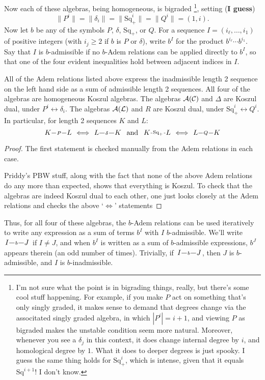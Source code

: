 \documentclass[11pt]{article}
\makeatletter
\newcommand{\produces}[3]{{#1}{#3}{#2}}
\renewcommand{\Q}{Q}
\newcommand{\SqShift}{\Sq_{+}}
\newcommand{\Sq}{\mathrm{Sq}}
\newcommand{\LieSteen}{\calA(\calL)}
\newcommand{\CommSteen}{\calA(\calC)}
\renewcommand{\produces}[3]{
{
\def\labelstyle{\scriptstyle}
\xymatrix@C=2em@1{
{#1}
\ar@{-}[r]|-{{\,#3\,}}
&%
{#2}%
}}}
\makeatother
\begin{document}
\begin{SteenrodAlgebrasAndTheirKoszulDuals}
Now each of these algebras, being homogeneous, is bigraded%
\footnote{I'm not sure what the point is in bigrading things, really, but there's some cool stuff happening. For example, if you make $P$ act on something that's only singly graded, it makes sense to demand that degrees change via the associtated singly graded algebra, in which $|P^i|=i+1$, and viewing $P$ as bigraded makes the unstable condition seem more natural. Moreover, whenever you see a $\delta_j$ in this context, it does change internal degree by $i$, and homological degree by $1$. What it does to deeper degrees is just spooky. I guess the same thing holds for $\SqShift^i$, which is intense, given that it equals $\Sq^{i+1}$! I don't know.}, setting (\textbf{I guess}) 
\[\|P^i\|=\|\delta_i\|=\|\SqShift^i\|=\|\Q^i\|=(1,i).\]
Now let $b$ be any of the symbols $P$, $\delta$, $\SqShift$, or $\Q$. For a sequence $I=(i_{\ell},\ldots,i_1)$ of positive integers (with $i_j\geq2$ if $b$ is $P$ or $\delta$), write $b^I$ for the product $b^{i_\ell}\cdots b^{i_1}$. Say that $I$ is $b$-admissible if no $b$-Adem relations can be applied directly to $b^I$, so that one of the four evident inequalities hold between adjacent indices in $I$.
\begin{lem*}
All of the Adem relations listed above express the inadmissible length 2 sequence on the left hand side as a sum of admissible length 2 sequences. All four of the algebras are homogeneous Koszul algebras. The algebras $\CommSteen$ and $\Delta$ are Koszul dual, under $P^i\longleftrightarrow\delta_i$. The algebras $\LieSteen$ and $R$ are Koszul dual, under $\SqShift^i\longleftrightarrow\Q^i$. In particular, for length 2 sequences $K$ and $L$:
\[\produces{K}{L}{P}\iff\produces{L}{K}{\delta}\textup{ \ and \ }\produces{K}{L}{\SqShift}\iff\produces{L}{K}{\Q}\]

\end{lem*}
\begin{proof}
The first statement is checked manually from the Adem relations in each case.

Priddy's PBW stuff, along with the fact that none of the above Adem relations do any more than expected, shows that everything is Koszul. To check that the algebras are indeed Koszul dual to each other, one just looks closely at the Adem relations and checks the above `$\iff$' statements
\end{proof}
Thus, for all four of these algebras, the $b$-Adem relations can be used iteratively to write any expression as a sum of terms $b^I$ with $I$ $b$-admissible. We'll write $\produces{I}{J}{b}$ if $I\neq J$, and when $b^I$ is written as a sum of $b$-admissible expressions, $b^J$ appears therein (an odd number of times). Trivially, if $\produces{I}{J}{b}$, then $J$ is $b$-admissible, and $I$ is $b$-inadmissible.


\end{SteenrodAlgebrasAndTheirKoszulDuals}
\end{document}

